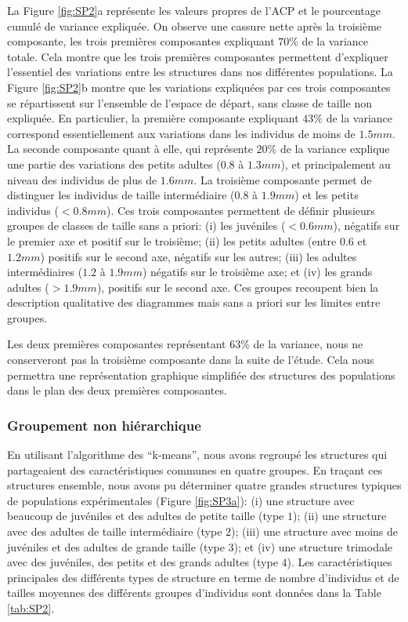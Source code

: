 La Figure \ref{fig:SP2}a représente les valeurs propres de l'ACP et le
pourcentage cumulé de variance expliquée. On observe une cassure nette après la
troisième composante, les trois premières composantes expliquant $70\%$ de la
variance totale. Cela montre que les trois premières composantes permettent
d'expliquer l'essentiel des variations entre les structures dans nos différentes
populations. La Figure \ref{fig:SP2}b montre que les variations expliquées
par ces trois composantes se répartissent sur l'ensemble de l'espace de départ,
sans classe de taille non expliquée.
En particulier, la première composante expliquant $43\%$ de la variance
correspond essentiellement aux variations dans les individus de moins de
$1.5mm$. La seconde composante quant à elle, qui représente $20\%$ de la
variance explique une partie des variations des petits adultes ($0.8$ à
$1.3mm$), et principalement au niveau des individus de plus de $1.6mm$. La troisième
composante permet de distinguer les individus de taille
intermédiaire ($0.8$ à $1.9mm$) et les petits individus ($<0.8mm$). Ces trois
composantes permettent de définir plusieurs groupes de classes de taille sans a
priori: (i) les juvéniles ($<0.6mm$), négatifs sur le premier axe et positif sur
le troisième; (ii) les petits adultes (entre $0.6$ et $1.2mm$) positifs sur le
second axe, négatifs sur les autres; (iii) les adultes intermédiaires ($1.2$ à
$1.9mm$) négatifs sur le troisième axe; et (iv) les grands adultes ($>1.9mm$),
positifs sur le second axe. Ces groupes recoupent bien la description
qualitative des diagrammes mais sans a priori sur les limites entre groupes.

Les deux premières composantes représentant $63\%$ de la variance, nous ne
conserveront pas la troisième composante dans la suite de l'étude. Cela nous
permettra une représentation graphique simplifiée des structures des populations
dans le plan des deux premières composantes. 

\subsubsection{Groupement non hiérarchique}

En utilisant l'algorithme des ``k-means'', nous avons regroupé les structures
qui partageaient des caractéristiques communes en quatre groupes. En traçant ces
structures ensemble, nous avons pu déterminer quatre grandes structures typiques
de populations expérimentales (Figure \ref{fig:SP3a}): (i) une structure avec
beaucoup de juvéniles et des adultes de petite taille (type $1$); (ii) une
structure avec des adultes de taille intermédiaire (type $2$); (iii) une
structure avec moins de juvéniles et des adultes de grande taille (type $3$); et
(iv) une structure trimodale avec des juvéniles, des petits et des grands
adultes (type $4$). Les caractéristiques principales des différents types de
structure en terme de nombre d'individus et de tailles moyennes des différents
groupes d'individus sont données dans la Table \ref{tab:SP2}.

